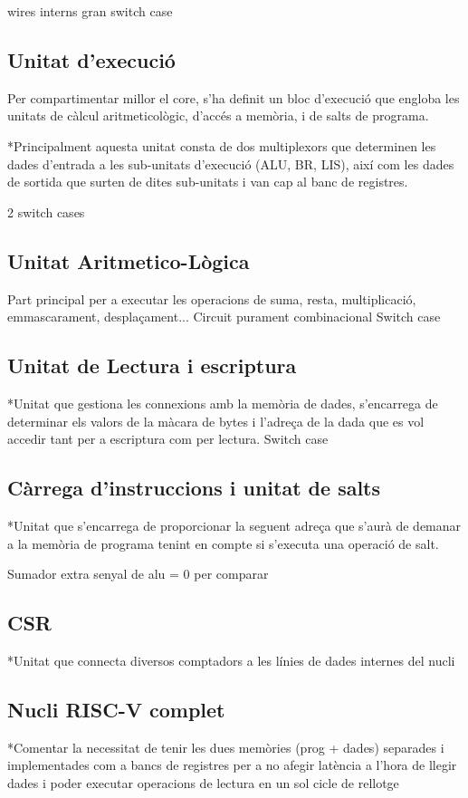 \documentclass[10pt,a4paper,twocolumn,twoside]{article}
\begin{document}
    wires interns 
    gran switch case
    
    \subsection{Unitat d'execució}
    Per compartimentar millor el core, s'ha definit un bloc d'execució que engloba les unitats de càlcul aritmeticològic, d'accés a memòria, i de salts de programa.
    
    *Principalment aquesta unitat consta de dos multiplexors que determinen les dades d'entrada a les sub-unitats d'execució (ALU, BR, LIS), així com les dades de sortida que surten de dites sub-unitats i van cap al banc de registres.
    
    2 switch cases
    
    
    \subsection{Unitat Aritmetico-Lògica}
    Part principal per a executar les operacions de suma, resta, multiplicació, emmascarament, desplaçament...
    Circuit purament combinacional
    Switch case 
    \subsection{Unitat de Lectura i escriptura}
    *Unitat que gestiona les connexions amb la memòria de dades, s'encarrega de determinar els valors de la màcara de bytes i l'adreça de la dada que es vol accedir tant per a escriptura com per lectura.
    Switch case
    \subsection{ Càrrega d'instruccions i unitat de salts}%
    *Unitat que s'encarrega de proporcionar la seguent adreça que s'aurà de demanar a la memòria de programa tenint en compte si s'executa una operació de salt.
    
    Sumador extra
    senyal de alu = 0 per comparar
    
    \subsection{CSR}
    
    *Unitat que connecta diversos comptadors a les línies de dades internes del nucli
    
    \subsection{Nucli RISC-V complet}
    *Comentar la necessitat de tenir les dues memòries (prog + dades) separades i implementades com a bancs de registres per a no afegir latència a l'hora de llegir dades i poder executar operacions de lectura en un sol cicle de rellotge
\end{document}

